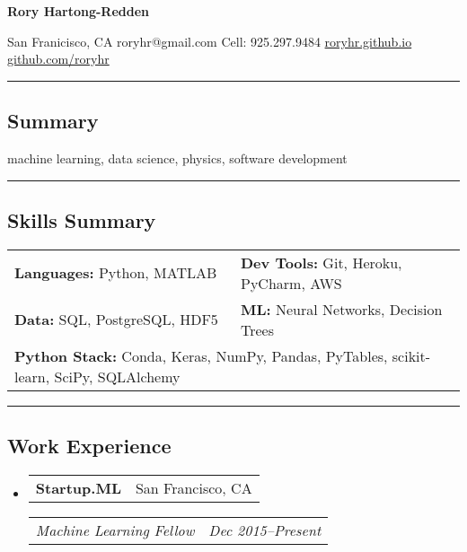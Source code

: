 \documentclass[10pt,letterpaper]{article}
\makeatletter
\newenvironment{indentsection}[1]%
{\begin{list}{}%
	{\setlength{\leftmargin}{#1}}%
	\item[]%
}
{\end{list}}
\newcommand{\headerrow}[2]
{\begin{tabular*}{\linewidth}{l@{\extracolsep{\fill}}r}
	#1 &
	#2 \\
\end{tabular*}}
\makeatother
\begin{document}
{\raggedright \LARGE \bf Rory Hartong-Redden\\}

{\raggedleft 
San Franicisco, CA \textbar\/ 
roryhr@gmail.com \textbar\/ 
Cell: 925.297.9484 \textbar\/ 
\href{roryhr.github.io}{roryhr.github.io} \textbar\/   
\href{https://github.com/roryhr}{github.com/roryhr}\\}
\hrule

\subsection*{Summary}
\begin{centering}  
machine learning, data science, physics, software development\\
\end{centering}

\hrule
\subsection*{Skills Summary}
\begin{indentsection}{\parindent}
\begin{tabular}{p{0.5\linewidth}   p{0.5\linewidth} } 
	\textbf{Languages:}  Python, MATLAB 	
	& \textbf{Dev Tools:}  Git, Heroku, PyCharm, AWS \\  

	\textbf{Data:} SQL, PostgreSQL, HDF5
	& \textbf{ML:} Neural Networks, Decision Trees  \\
	
	\multicolumn{2}{l}{\textbf{Python Stack:} Conda, Keras, NumPy, Pandas, PyTables, scikit-learn, SciPy, SQLAlchemy} \\
\end{tabular}
\end{indentsection}

\hrule
\subsection*{Work Experience}
\begin{itemize}
	\parskip=-0.1em
	\item
	\headerrow
		{\textbf{Startup.ML}}
		{San Francisco, CA}
	\headerrow
		{\emph{Machine Learning Fellow}}
		{\emph{Dec 2015--Present}}
\end{itemize}
\end{document}
